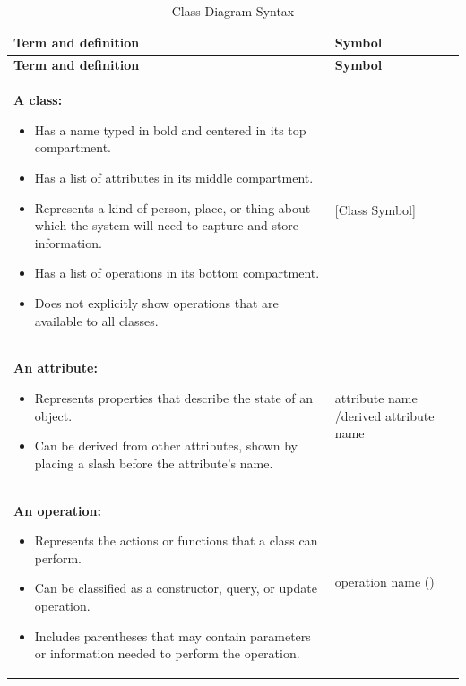 \documentclass[12pt,a4paper]{report}
\begin{document}
\begin{longtable}{|p{8cm}|p{4cm}|}
\caption{Class Diagram Syntax} \label{tab:class} \\
\hline
\textbf{Term and definition} & \textbf{Symbol} \\
\hline
\endfirsthead
\hline
\textbf{Term and definition} & \textbf{Symbol} \\
\hline
\endhead

\textbf{A class:} \newline
\begin{itemize}
    \item Has a name typed in bold and centered in its top compartment.
    \item Has a list of attributes in its middle compartment.
    \item Represents a kind of person, place, or thing about which the system will need to capture and store information.
    \item Has a list of operations in its bottom compartment.
    \item Does not explicitly show operations that are available to all classes.
\end{itemize} & [Class Symbol] \\
\hline

\textbf{An attribute:} \newline
\begin{itemize}
    \item Represents properties that describe the state of an object.
    \item Can be derived from other attributes, shown by placing a slash before the attribute's name.
\end{itemize} & attribute name \newline /derived attribute name \\
\hline

\textbf{An operation:} \newline
\begin{itemize}
    \item Represents the actions or functions that a class can perform.
    \item Can be classified as a constructor, query, or update operation.
    \item Includes parentheses that may contain parameters or information needed to perform the operation.
\end{itemize} & operation name () \\
\hline


\end{longtable}
\end{document}
